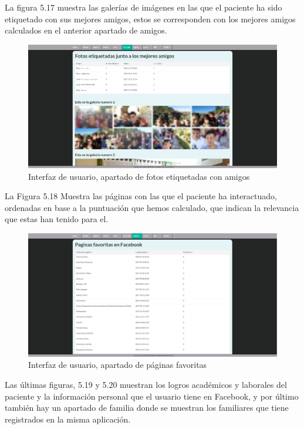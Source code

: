 La figura 5.17 muestra las galerías de imágenes en las que el paciente ha sido etiquetado con sus mejores amigos, estos se corresponden con los mejores amigos calculados en el anterior apartado de amigos.
\begin{figure}
	\begin{center}
		\includegraphics[scale=0.3]{Imagenes/Fuentes/InterfazFoto_tag.png} \caption{Interfaz de usuario, apartado de fotos etiquetadas con amigos}
		\label{WebAplication7}
	\end{center}
\end{figure}
La Figura 5.18 Muestra las páginas con las que el paciente ha interactuado, ordenadas en base a la puntuación que hemos calculado, que indican la relevancia que estas han tenido para el.
\begin{figure}
	\begin{center}
		\includegraphics[scale=0.3]{Imagenes/Fuentes/InterfazPaginas.png} \caption{Interfaz de usuario, apartado de páginas favoritas}
		\label{WebAplication8}
	\end{center}
\end{figure}
Las últimas figuras, 5.19 y 5.20 muestran los logros académicos y laborales del paciente y la información personal que el usuario tiene en Facebook, y por último también hay un apartado de familia donde se muestran los familiares que tiene registrados en la misma aplicación.
